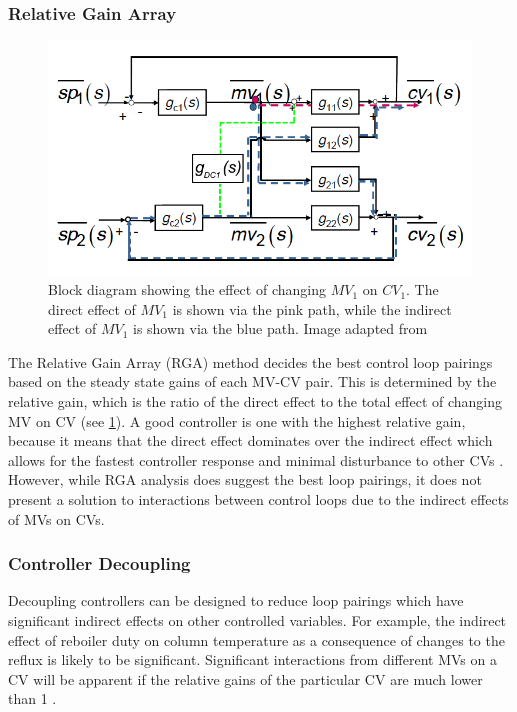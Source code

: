 \subsubsection{Relative Gain Array}
    \begin{figure}
        \vspace{-\intextsep}
        \centering
        \includegraphics[width=\linewidth]{chapters/4-operation-control/4-Figures/RGA-Thornhill-2013.png}
        \caption{Block diagram showing the effect of changing $MV_1$ on $CV_1$. The direct effect of $MV_1$ is shown via the pink path, while the indirect effect of $MV_1$ is shown via the blue path. Image adapted from \textcite{thornhill_process_2009}}
        \label{fig:RGA-block-di}
    \end{figure}
The Relative Gain Array (RGA) method decides the best control loop pairings based on the steady state gains of each MV-CV pair. This is determined by the relative gain, which is the ratio of the direct effect to the total effect of changing MV on CV (see \cref{fig:RGA-block-di}). A good controller is one with the highest relative gain, because it means that the direct effect dominates over the indirect effect which allows for the fastest controller response and minimal disturbance to other CVs \cite{seborg_process_2011}. However, while RGA analysis does suggest the best loop pairings, it does not present a solution to interactions between control loops due to the indirect effects of MVs on CVs.

\subsubsection{Controller Decoupling}
Decoupling controllers can be designed to reduce loop pairings which have significant indirect effects on other controlled variables. For example, the indirect effect of reboiler duty on column temperature as a consequence of changes to the reflux is likely to be significant. Significant interactions from different MVs on a CV will be apparent if the relative gains of the particular CV are much lower than 1 \cite{lim_121_2020}. 

